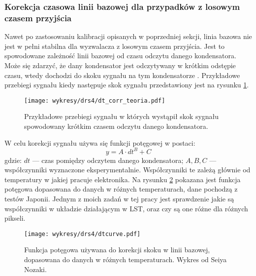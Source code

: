 \documentclass[a4paper,11pt,twoside]{article}
\begin{document}
\subsubsection{Korekcja czasowa linii bazowej dla przypadków z losowym czasem przyjścia}
Nawet po zastosowaniu kalibracji opisanych w poprzedniej sekcji, linia bazowa nie jest w pełni stabilna dla wyzwalacza z losowym czasem przyjścia. Jest to spowodowane zależność linii bazowej od czasu odczytu danego kondensatora. Może się zdarzyć, że dany kondensator jest odczytywany w krótkim odstępie czasu, wtedy dochodzi do skoku sygnału na tym kondensatorze \cite{drs4_magic}. Przykładowe przebiegi sygnału kiedy następuje skok sygnału przedstawiony jest na rysunku \ref{fig:dt_corr}. 
\begin{figure}[H] 
\centering
\texttt{[image: wykresy/drs4/dt\_corr\_teoria.pdf]}
\caption{Przykładowe przebiegi sygnału w których wystąpił skok sygnału spowodowany krótkim czasem odczytu danego kondensatora.}
\label{fig:dt_corr}
\end{figure}
W celu korekcji sygnału używa się funkcji potęgowej w postaci:
\begin{equation}
y = A \cdot dt^B + C
\end{equation}
gdzie: $dt$ --- czas pomiędzy odczytem danego kondensatora; $A, B, C$ --- współczynniki wyznaczone eksperymentalnie. 
Współczynniki te zależą głównie od temperatury w jakiej pracuje elektronika. Na rysunku \ref{fig:dt_corr_fit} pokazana jest funkcja potęgowa dopasowana do danych w różnych temperaturach, dane pochodzą z testów Japonii. Jednym z moich zadań w tej pracy jest sprawdzenie jakie są współczynniki w układzie działającym w LST, oraz czy są one różne dla różnych pikseli. 
\begin{figure}[H] 
\centering
\texttt{[image: wykresy/drs4/dtcurve.pdf]}
\caption{Funkcja potęgowa używana do korekcji skoku w linii bazowej, dopasowana do danych w różnych temperaturach. Wykres od Seiya Nozaki.}
\label{fig:dt_corr_fit}
\end{figure}
\newpage
\end{document}
